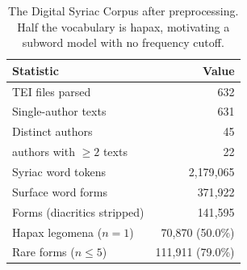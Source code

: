\begin{table}[t]
  \centering
  \begin{tabular}{lr}
    \toprule
    \textbf{Statistic} & \textbf{Value} \\
    \midrule
    TEI files parsed              & 632 \\
    Single-author texts           & 631 \\
    Distinct authors              & 45 \\
    \quad authors with $\geq 2$ texts & 22 \\
    Syriac word tokens            & 2{,}179{,}065 \\
    Surface word forms            & 371{,}922 \\
    Forms (diacritics stripped)   & 141{,}595 \\
    Hapax legomena ($n{=}1$)      & 70{,}870 \;(50.0\%) \\
    Rare forms ($n\leq 5$)        & 111{,}911 \;(79.0\%) \\
    \bottomrule
  \end{tabular}
  \caption{The Digital Syriac Corpus after preprocessing. Half the vocabulary is
  hapax, motivating a subword model with no frequency cutoff.}
  \label{tab:corpus}
\end{table}
